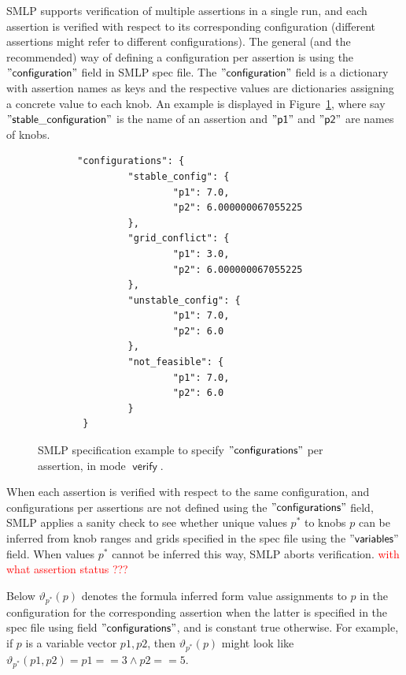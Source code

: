 \documentclass[a4paper,parskip=half]{article} %
\newcommand*\eqdef=
\newcommand*\mode[1]{\operatorname{\mathsf{#1}}} %
\newcommand*\speckey[1]{\operatorname{\mathsf{"{#1}"}}} %
\newcommand\todozk[1]{\textcolor{red}{#1}}
\newcommand*\ZK{\todozk}
\begin{document}
SMLP supports verification of multiple assertions in a single run, and each assertion is verified with respect to its corresponding
configuration (different assertions might refer to different configurations). The general (and the recommended) way of
defining a configuration per assertion is using the $\speckey{configuration}$ field in SMLP spec file. The  $\speckey{configuration}$
field is a dictionary with assertion names as keys and the respective values are dictionaries assigning a concrete value to each knob.
An example is displayed in Figure~\ref{fig:verify:witness:spec}, where say  $\speckey{stable\_configuration}$ is the name of an assertion
and $\speckey{p1}$ and $\speckey{p2}$ are names of knobs.

\begin{figure}[tp]%
\small
\begin{verbatim}
       "configurations": {
                "stable_config": {
                        "p1": 7.0,
                        "p2": 6.000000067055225
                },
                "grid_conflict": {
                        "p1": 3.0,
                        "p2": 6.000000067055225
                },
                "unstable_config": {
                        "p1": 7.0,
                        "p2": 6.0
                },
                "not_feasible": {
                        "p1": 7.0,
                        "p2": 6.0
                }
        }
\end{verbatim}
\caption{SMLP specification example to specify $\speckey{configurations}$ per assertion, in mode $\mode{verify}$.}
\label{fig:verify:witness:spec}
\end{figure}

When each assertion is verified with respect to the same configuration, and configurations per assertions are not defined using 
the  $\speckey{configurations}$ field, SMLP applies a sanity check to see whether unique values $p^*$ to knobs $p$ can be inferred 
from knob ranges and grids specified in the spec file using the $\speckey{variables}$ field. When values $p^*$ cannot be inferred 
this way, SMLP aborts verification. \ZK{with what assertion status ???}


Below $\vartheta_{p^*}(p)$ denotes the formula inferred form value assignments to $p$ in 
the configuration for the corresponding assertion when the latter is specified in the spec file using field
$\speckey{configurations}$, and is constant true otherwise. For example, if $p$ is a variable vector $p1,p2$,  
then $\vartheta_{p^*}(p)$ might look like  $\vartheta_{p^*}(p1,p2)\eqdef p1 == 3 \wedge p2 == 5$.
\end{document}
